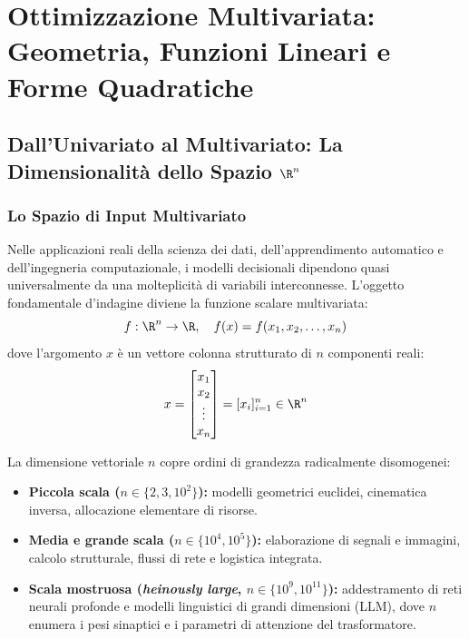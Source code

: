 \chapter{Ottimizzazione Multivariata: Geometria, Funzioni Lineari e Forme Quadratiche}
\label{chap:opt-multivariata-lineare-quadratica}

\section{Dall'Univariato al Multivariato: La Dimensionalit\`a dello Spazio \texorpdfstring{$\R^n$}{R\textasciicircum n}}
\label{sec:opt-dimensionalita-rn}

\subsection{Lo Spazio di Input Multivariato}
Nelle applicazioni reali della scienza dei dati, dell'apprendimento automatico e dell'ingegneria computazionale, i modelli decisionali dipendono quasi universalmente da una molteplicit\`a di variabili interconnesse. L'oggetto fondamentale d'indagine diviene la funzione scalare multivariata:
\begin{equation}
f: \R^n \to \R, \quad f(x) = f(x_1, x_2, \dots, x_n)
\end{equation}
dove l'argomento $x$ \`e un vettore colonna strutturato di $n$ componenti reali:
\begin{equation}
x = \begin{bmatrix} x_1 \\ x_2 \\ \vdots \\ x_n \end{bmatrix} = [x_i]_{i=1}^n \in \R^n
\end{equation}

La dimensione vettoriale $n$ copre ordini di grandezza radicalmente disomogenei:
\begin{itemize}
    \item \textbf{Piccola scala ($n \in \{2, 3, 10^2\}$):} modelli geometrici euclidei, cinematica inversa, allocazione elementare di risorse.
    \item \textbf{Media e grande scala ($n \in \{10^4, 10^5\}$):} elaborazione di segnali e immagini, calcolo strutturale, flussi di rete e logistica integrata.
    \item \textbf{Scala mostruosa (\textit{heinously large}, $n \in \{10^9, 10^{11}\}$):} addestramento di reti neurali profonde e modelli linguistici di grandi dimensioni (LLM), dove $n$ enumera i pesi sinaptici e i parametri di attenzione del trasformatore.
\end{itemize}

